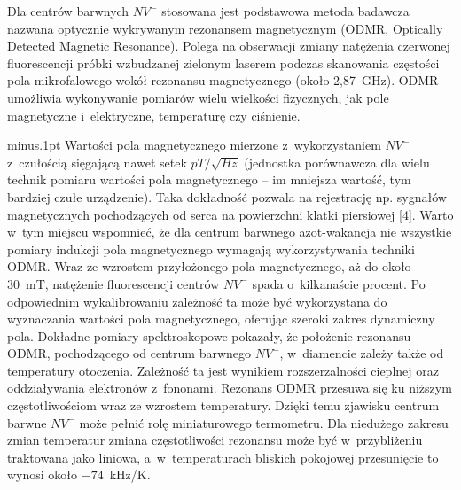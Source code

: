 Dla centrów barwnych $NV^{-}$ stosowana jest podstawowa metoda badawcza nazwana optycznie wykrywanym rezonansem magnetycznym (ODMR, Optically Detected Magnetic Resonance). Polega na obserwacji zmiany natężenia czerwonej fluorescencji próbki wzbudzanej
zielonym laserem podczas skanowania częstości pola mikrofalowego wokół rezonansu
magnetycznego (około 2,87~GHz). ODMR umożliwia wykonywanie pomiarów wielu wielkości fizycznych, jak pole magnetyczne i~elektryczne, temperaturę czy ciśnienie.

\baselineskip12pt minus.1pt
Wartości pola magnetycznego mierzone z~wykorzystaniem $NV^{-}$ z~czułością sięgającą nawet setek $pT/\sqrt{Hz}$ (jednostka porównawcza dla wielu technik pomiaru wartości pola magnetycznego -- im mniejsza wartość, tym bardziej czułe urządzenie). Taka dokładność pozwala na rejestrację np. sygnałów magnetycznych pochodzących od serca na powierzchni klatki piersiowej [4].
Warto w~tym miejscu wspomnieć, że dla centrum  barwnego azot-wakancja nie wszystkie pomiary indukcji pola magnetycznego wymagają wykorzystywania techniki ODMR.  Wraz ze wzrostem przyłożonego pola magnetycznego, aż do około 30~mT, natężenie fluorescencji centrów $NV^{-}$  spada o~kilkanaście procent. Po odpowiednim wykalibrowaniu zależność ta może być wykorzystana do wyznaczania wartości pola magnetycznego, oferując szeroki zakres dynamiczny pola.
Dokładne pomiary spektroskopowe pokazały, że położenie rezonansu ODMR, pochodzącego od centrum barwnego $NV^{-}$, w~diamencie zależy także od temperatury otoczenia. Zależność ta jest wynikiem rozszerzalności cieplnej oraz oddziaływania elektronów z~fononami. Rezonans ODMR przesuwa się ku niższym częstotliwościom wraz ze wzrostem temperatury.  Dzięki temu zjawisku centrum barwne $NV^{-}$ może pełnić rolę miniaturowego termometru. Dla niedużego zakresu zmian temperatur zmiana częstotliwości rezonansu może być w~przybliżeniu traktowana jako liniowa, a~w~temperaturach bliskich pokojowej przesunięcie to wynosi około $-74$~kHz/K.

